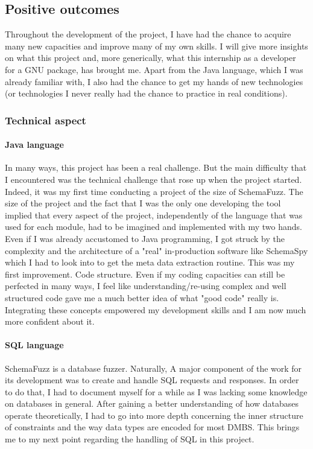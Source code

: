 	\subsection{Positive outcomes}
Throughout the development of the project, I have had the chance to acquire many new capacities and improve many of my own skills. I will give more insights on what this project and, more generically, what this internship as a developer for a GNU package, has brought me.
Apart from the Java language, which I was already familiar with, I also had the chance to get my hands of new technologies (or technologies I never really had the chance to practice in real conditions). 

		\subsubsection{Technical aspect}
		
		\paragraph{Java language}
In many ways, this project has been a real challenge. But the main difficulty that I encountered was the technical challenge that rose up when the project started. Indeed, it was my first time conducting a project of the size of SchemaFuzz. The size of the project and the fact that I was the only one developing the tool implied that every aspect of the project, independently of the language that was used for each module, had to be imagined and implemented with my two hands.
Even if I was already accustomed to Java programming, I got struck by the complexity and the architecture of a "real" in-production software like SchemaSpy which I had to look into to get the meta data extraction routine.
This was my first improvement. Code structure. Even if my coding capacities can still be perfected in many ways, I feel like understanding/re-using complex and well structured code gave me a much better idea of what "good code" really is. Integrating these concepts empowered my development skills and I am now much more confident about it.

			\paragraph{SQL language}
SchemaFuzz is a database fuzzer. Naturally, A major component of the work for its development was to create and handle SQL requests and responses. In order to do that, I had to document myself for a while as I was lacking some knowledge on databases in general. After gaining a better understanding of how databases operate theoretically, I had to go into more depth concerning the inner structure of constraints and the way data types are encoded for most DMBS.
This brings me to my next point regarding the handling of SQL in this project.

